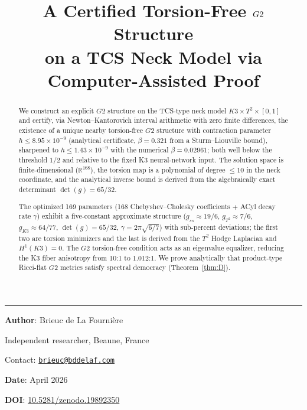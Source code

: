 \documentclass[11pt,a4paper]{article}
\title{%
\LARGE\textbf{A Certified Torsion-Free $\Gtwo$ Structure\\[0.2em]
on a TCS Neck Model via Computer-Assisted Proof}
}
\author{}
\date{}
\theoremstyle{definition}
\theoremstyle{remark}
\newcommand{\RR}{\mathbb{R}}
\newcommand{\Gtwo}{\mathrm{G}_2}
\def\Gtwo{G2}%
\begin{document}
\maketitle
\noindent\rule{\textwidth}{0.2pt}

\noindent\textbf{Author}: Brieuc de La Fourni\`ere

\noindent Independent researcher, Beaune, France

\noindent Contact: \href{mailto:brieuc@bddelaf.com}{\texttt{brieuc@bddelaf.com}}

\noindent\textbf{Date}: April 2026

\noindent\textbf{DOI}: \href{https://doi.org/10.5281/zenodo.19892350}{10.5281/zenodo.19892350}

\vfill

\begin{abstract}
We construct an explicit $\Gtwo$ structure on the TCS-type neck model $K3 \times T^2 \times [0,1]$ and certify, via Newton--Kantorovich interval arithmetic with zero finite differences, the existence of a unique nearby torsion-free $\Gtwo$ structure with contraction parameter $h \leq 8.95 \times 10^{-9}$ (analytical certificate, $\beta = 0.321$ from a Sturm--Liouville bound), sharpened to $h \leq 1.43 \times 10^{-9}$ with the numerical $\beta = 0.02961$; both well below the threshold $1/2$ and relative to the fixed K3 neural-network input. The solution space is finite-dimensional ($\RR^{168}$), the torsion map is a polynomial of degree $\leq 10$ in the neck coordinate, and the analytical inverse bound is derived from the algebraically exact determinant $\det(g) = 65/32$.

The optimized 169 parameters (168 Chebyshev--Cholesky coefficients $+$ ACyl decay rate $\gamma$) exhibit a five-constant approximate structure ($g_{ss} \approx 19/6$, $g_{T^2} \approx 7/6$, $g_{K3} \approx 64/77$, $\det(g) = 65/32$, $\gamma = 2\pi\sqrt{6/7}$) with sub-percent deviations; the first two are torsion minimizers and the last is derived from the $T^2$ Hodge Laplacian and $H^1(K3) = 0$. The $\Gtwo$ torsion-free condition acts as an eigenvalue equalizer, reducing the K3 fiber anisotropy from 10:1 to 1.012:1. We prove analytically that product-type Ricci-flat $\Gtwo$ metrics satisfy spectral democracy (Theorem~\ref{thm:D}).


\end{abstract}
\end{document}
